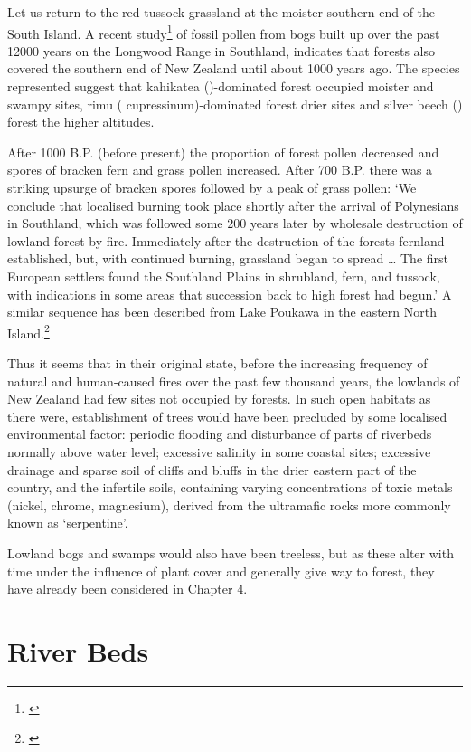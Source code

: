 Let us return to the red tussock grassland at the moister southern end of the South Island.
A recent study\footnote{\cite{mcglone1983vegetation}} of fossil pollen from bogs built up over the past 12000 years on the Longwood Range in Southland, indicates that forests also covered the southern end of New Zealand until about 1000 years ago.
The species represented suggest that kahikatea ()-dominated forest occupied moister and swampy sites, rimu ( cupressinum)-dominated forest drier sites and silver beech () forest the higher altitudes.

After 1000 B.P. (before present) the proportion of forest pollen decreased and spores of bracken fern and grass pollen increased.
After 700 B.P. there was a striking upsurge of bracken spores followed by a peak of grass pollen: `We conclude that localised burning took place shortly after the arrival of Polynesians in Southland, which was followed some 200 years later by wholesale destruction of lowland forest by fire.
Immediately after the destruction of the forests fernland established, but, with continued burning, grassland began to spread … The first European settlers found the Southland Plains in shrubland, fern, and tussock, with indications in some areas that succession back to high forest had begun.' A similar sequence has been described from Lake Poukawa in the eastern North Island.\footnote{\cite{mcglone1978forest}}

Thus it seems that in their original state, before the increasing frequency of natural and human-caused fires over the past few thousand years, the lowlands of New Zealand had few sites not occupied by forests.
In such open habitats as there were, establishment of trees would have been precluded by some localised environmental factor: periodic flooding and disturbance of parts of riverbeds normally above water level; excessive salinity in some coastal sites; excessive drainage and sparse soil of cliffs and bluffs in the drier eastern part of the country, and the infertile soils, containing varying concentrations of toxic metals (nickel, chrome, magnesium), derived from the ultramafic rocks more commonly known as `serpentine'.

Lowland bogs and swamps would also have been treeless, but as these alter with time under the influence of plant cover and generally give way to forest, they have already been considered in Chapter 4.

\section{River Beds}

